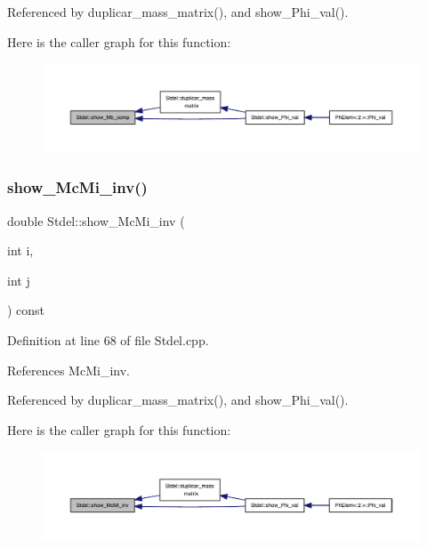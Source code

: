Referenced by duplicar\+\_\+mass\+\_\+matrix(), and show\+\_\+\+Phi\+\_\+val().

Here is the caller graph for this function\+:
\nopagebreak
\begin{figure}[H]
\begin{center}
\leavevmode
\includegraphics[width=350pt]{classStdel_a4860f0f650640f859c5f75c206ee1f60_icgraph}
\end{center}
\end{figure}
\mbox{\label{classStdel_a44d5aa234e02fb41afd5a4e5e45fadc4}} 
\subsubsection{\texorpdfstring{show\+\_\+\+Mc\+Mi\+\_\+inv()}{show\_McMi\_inv()}}
{\footnotesize\ttfamily double Stdel\+::show\+\_\+\+Mc\+Mi\+\_\+inv (\begin{DoxyParamCaption}\item[{int}]{i,  }\item[{int}]{j }\end{DoxyParamCaption}) const}



Definition at line 68 of file Stdel.\+cpp.



References Mc\+Mi\+\_\+inv.



Referenced by duplicar\+\_\+mass\+\_\+matrix(), and show\+\_\+\+Phi\+\_\+val().

Here is the caller graph for this function\+:
\nopagebreak
\begin{figure}[H]
\begin{center}
\leavevmode
\includegraphics[width=350pt]{classStdel_a44d5aa234e02fb41afd5a4e5e45fadc4_icgraph}
\end{center}
\end{figure}
\mbox{\label{classStdel_a11bf2897170ada9a9dd8f641a39585e5}} 
